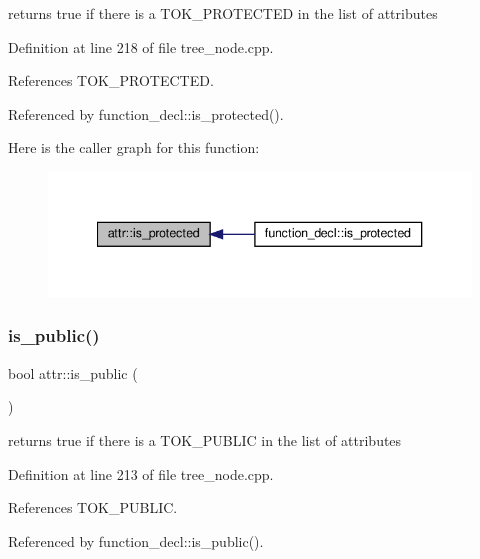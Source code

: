 returns true if there is a T\+O\+K\+\_\+\+P\+R\+O\+T\+E\+C\+T\+ED in the list of attributes 



Definition at line 218 of file tree\+\_\+node.\+cpp.



References T\+O\+K\+\_\+\+P\+R\+O\+T\+E\+C\+T\+ED.



Referenced by function\+\_\+decl\+::is\+\_\+protected().

Here is the caller graph for this function\+:
\nopagebreak
\begin{figure}[H]
\begin{center}
\leavevmode
\includegraphics[width=340pt]{dc/de4/structattr_a9082e7e1db15a75b382be7a30590dc6a_icgraph}
\end{center}
\end{figure}
\mbox{\label{structattr_a413e673300e8b18f23026cf752d22bed}} 
\subsubsection{\texorpdfstring{is\+\_\+public()}{is\_public()}}
{\footnotesize\ttfamily bool attr\+::is\+\_\+public (\begin{DoxyParamCaption}{ }\end{DoxyParamCaption})}



returns true if there is a T\+O\+K\+\_\+\+P\+U\+B\+L\+IC in the list of attributes 



Definition at line 213 of file tree\+\_\+node.\+cpp.



References T\+O\+K\+\_\+\+P\+U\+B\+L\+IC.



Referenced by function\+\_\+decl\+::is\+\_\+public().

